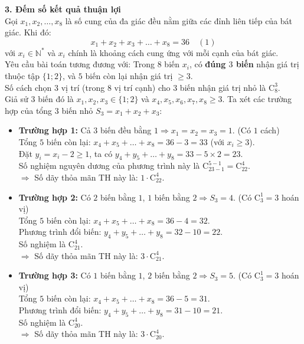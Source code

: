 \begin{ex}
{		\textbf{3. Đếm số kết quả thuận lợi}\\
		Gọi $x_1, x_2, \ldots, x_8$ là số cung của đa giác đều nằm giữa các đỉnh liên tiếp của bát giác. Khi đó:
		\begin{equation}
			x_1 + x_2 + x_3 + \dots + x_8 = 36 \quad (1)
		\end{equation}
		với $x_i \in \mathbb{N}^*$ và $x_i$ chính là khoảng cách cung ứng với mỗi cạnh của bát giác.\\
		Yêu cầu bài toán tương đương với: Trong $8$ biến $x_i$, có \textbf{đúng $3$ biến} nhận giá trị thuộc tập $\{1; 2\}$, và $5$ biến còn lại nhận giá trị $\ge 3$.\\
		Số cách chọn $3$ vị trí (trong $8$ vị trí cạnh) cho $3$ biến nhận giá trị nhỏ là $\mathrm{C}_8^3$.\\
		Giả sử $3$ biến đó là $x_1, x_2, x_3 \in \{1; 2\}$ và $x_4, x_5, x_6, x_7, x_8 \ge 3$. Ta xét các trường hợp của tổng $3$ biến nhỏ $S_3 = x_1 + x_2 + x_3$:
		
		\begin{itemize}
			\item \textbf{Trường hợp 1:} Cả $3$ biến đều bằng $1 \Rightarrow x_1=x_2=x_3=1$. (Có $1$ cách)\\
			Tổng $5$ biến còn lại: $x_4 + x_5 + \dots + x_8 = 36 - 3 = 33$ (với $x_i \ge 3$).\\
			Đặt $y_i = x_i - 2 \ge 1$, ta có $y_4 + y_5 + \dots + y_8 = 33 - 5 \times 2 = 23$.\\
			Số nghiệm nguyên dương của phương trình này là $\mathrm{C}_{23-1}^{5-1} = \mathrm{C}_{22}^4$.\\
			$\Rightarrow$ Số dãy thỏa mãn TH này là: $1 \cdot \mathrm{C}_{22}^4$.
			
			\item \textbf{Trường hợp 2:} Có $2$ biến bằng $1$, $1$ biến bằng $2 \Rightarrow S_3 = 4$. (Có $\mathrm{C}_3^1 = 3$ hoán vị)\\
			Tổng $5$ biến còn lại: $x_4 + x_5 + \dots + x_8 = 36 - 4 = 32$.\\
			Phương trình đổi biến: $y_4 + y_5 + \dots + y_8 = 32 - 10 = 22$.\\
			Số nghiệm là $\mathrm{C}_{21}^4$.\\
			$\Rightarrow$ Số dãy thỏa mãn TH này là: $3 \cdot \mathrm{C}_{21}^4$.
			
			\item \textbf{Trường hợp 3:} Có $1$ biến bằng $1$, $2$ biến bằng $2 \Rightarrow S_3 = 5$. (Có $\mathrm{C}_3^1 = 3$ hoán vị)\\
			Tổng $5$ biến còn lại: $x_4 + x_5 + \dots + x_8 = 36 - 5 = 31$.\\
			Phương trình đổi biến: $y_4 + y_5 + \dots + y_8 = 31 - 10 = 21$.\\
			Số nghiệm là $\mathrm{C}_{20}^4$.\\
			$\Rightarrow$ Số dãy thỏa mãn TH này là: $3 \cdot \mathrm{C}_{20}^4$.
			

\end{itemize}}
\end{ex}
